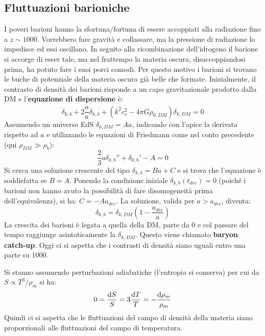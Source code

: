 \subsection{Fluttuazioni barioniche}
I poveri barioni hanno la sfortuna/fortuna di essere accoppiati alla radiazione fino a $z\sim 1000$.  Vorrebbero fare gravità e collassare, ma la pressione di radiazione lo impedisce ed essi oscillano. In seguito alla ricombinazione dell'idrogeno il barione si accorge di esser tale, ma nel frattempo la materia oscura, disaccoppiandosi prima, ha potuto fare i suoi porci comodi. Per questo motivo i barioni si trovano le buche di potenziale della materia oscura già belle che formate. Inizialmente, il contrasto di densità dei barioni risponde a un capo gravitazionale prodotto dalla DM e l'\textbf{equazione di dispersione} è:
\begin{equation}
    \ddot{\delta}_{k,b}+ 2 \frac{\dot{a}}{a}\dot{\delta}_{k,b} + \left( k^2 c_s^2 -4\pi G \rho_{0,DM}\right)\delta_{k,DM}  =0
\end{equation}
Assumendo un universo EdS $\delta_{k,DM}=Aa$, indicando con l'apice la derivata rispetto ad $a$ e utilizzando le equazioni di Friedmann come nel conto precedente (qui $\rho_{DM}\gg\rho_{b}$):
\begin{equation*}
    \frac{2}{3}a\delta_{k,b}''+\delta_{k,b}' -A=0
\end{equation*}
Si cerca una soluzione crescente del tipo $\delta_{k,b}=Ba+C$ e si trova che l'equazione è soddisfatta se $B=A$. Ponendo la condizione iniziale $\delta_{k,b}(t_{dec})=0$ (poiché i barioni non hanno avuto la possibilità di fare disomogeneità prima dell'equivalenza), si ha: $C=-Aa_{dec}$. La soluzione, valida per $a>a_{dec}$, diventa:
$$
\delta_{k,b}=\delta_{k,DM}\left(1-\frac{a_{dec}}{a}\right)
$$
La crescita dei barioni è legata a quella della DM, parte da 0 e col passare del tempo raggiunge asintoticamente la $\delta_{k,DM}$. Questo viene chiamato \textbf{baryon catch-up}. Oggi ci si aspetta che i contrasti di densità siano uguali entro una parte su 1000. 

\vspace{1em}
\noindent Si stanno assumendo perturbazioni adiabatiche (l'entropia si conserva) per cui da $S\propto T^3/\rho_m$ si ha:
$$
0=\frac{\operatorname{d}\!{S}}{S}=3 \frac{\operatorname{d}\!{T}}{T}=-\frac{\operatorname{d}\!{\rho_m}}{\rho_m}
$$
Quindi ci si aspetta che le fluttuazioni del campo di densità della materia siano proporzionali alle fluttuazioni del campo di temperatura. 

